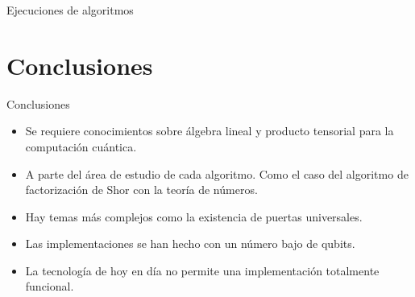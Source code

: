 \documentclass[10pt,compress]{beamer}
\begin{document}
\begin{frame}{Ejecuciones de algoritmos}
{\begin{center}
\end{center}}

\end{frame}

\section{Conclusiones}

\begin{frame}{Conclusiones}
\begin{itemize}[<+->]
\item Se requiere conocimientos sobre álgebra lineal y producto tensorial para la computación cuántica.

\item A parte del área de estudio de cada algoritmo. Como el caso del algoritmo de factorización de Shor con la teoría de números.

\item Hay temas más complejos como la existencia de puertas universales.

\item Las implementaciones se han hecho con un número bajo de qubits.

\item La tecnología de hoy en día no permite una implementación totalmente funcional.

\end{itemize}

\end{frame}
\end{document}
